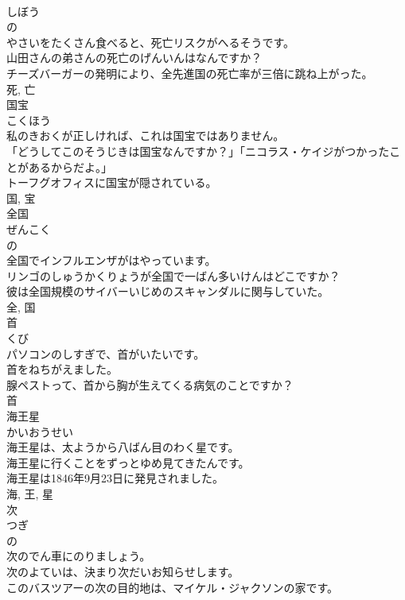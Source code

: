 \documentclass[8pt]{extreport}
\begin{document}
\begin{CJK}{UTF8}{min}
\\	しぼう	
\\	の 
\\	やさいをたくさん食べると、死亡リスクがへるそうです。	
\\	山田さんの弟さんの死亡のげんいんはなんですか？	
\\	チーズバーガーの発明により、全先進国の死亡率が三倍に跳ね上がった。	
\\	死, 亡	
\\	国宝	
\\	こくほう	
\\	私のきおくが正しければ、これは国宝ではありません。	
\\	「どうしてこのそうじきは国宝なんですか？」「ニコラス・ケイジがつかったことがあるからだよ。」	
\\	トーフグオフィスに国宝が隠されている。	
\\	国, 宝	
\\	全国	
\\	ぜんこく	
\\	の 
\\	全国でインフルエンザがはやっています。	
\\	リンゴのしゅうかくりょうが全国で一ばん多いけんはどこですか？	
\\	彼は全国規模のサイバーいじめのスキャンダルに関与していた。	
\\	全, 国	
\\	首	
\\	くび	
\\	パソコンのしすぎで、首がいたいです。	
\\	首をねちがえました。	
\\	腺ペストって、首から胸が生えてくる病気のことですか？	
\\	首	
\\	海王星	
\\	かいおうせい	
\\	海王星は、太ようから八ばん目のわく星です。	
\\	海王星に行くことをずっとゆめ見てきたんです。	
\\	海王星は1846年9月23日に発見されました。	
\\	海, 王, 星	
\\	次	
\\	つぎ	
\\	の 
\\	次のでん車にのりましょう。	
\\	次のよていは、決まり次だいお知らせします。	
\\	このバスツアーの次の目的地は、マイケル・ジャクソンの家です。	

\end{CJK}
\end{document}
